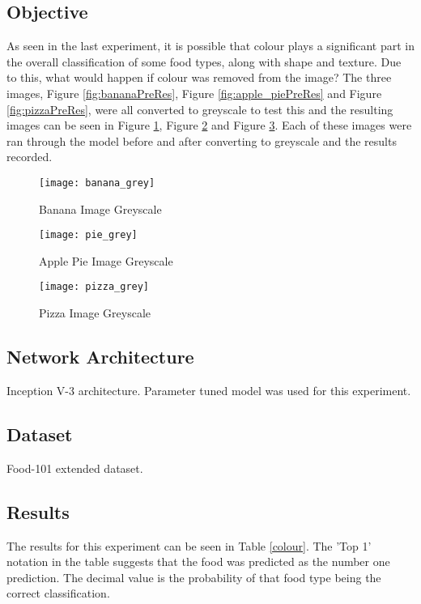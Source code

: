 \tocless\subsection{Objective}
As seen in the last experiment, it is possible that colour plays a significant part in the overall classification of some food types, along with shape and texture. Due to this, what would happen if colour was removed from the image? The three images, Figure \ref{fig:bananaPreRes}, Figure \ref{fig:apple_piePreRes} and Figure \ref{fig:pizzaPreRes}, were all converted to greyscale to test this and the resulting images can be seen in Figure \ref{fig:bananaGrey}, Figure \ref{fig:applePieGrey} and Figure \ref{fig:pizzaGrey}. Each of these images were ran through the model before and after converting to greyscale and the results recorded.

\begin{figure}[h]
	\centering
    \texttt{[image: banana\_grey]}
    \caption{Banana Image Greyscale}
    \label{fig:bananaGrey}
\end{figure}

\begin{figure}[h]
	\centering
    \texttt{[image: pie\_grey]}
    \caption{Apple Pie Image Greyscale}
    \label{fig:applePieGrey}
\end{figure}

\begin{figure}[h]
	\centering
    \texttt{[image: pizza\_grey]}
    \caption{Pizza Image Greyscale}
    \label{fig:pizzaGrey}
\end{figure}

\tocless\subsection{Network Architecture}
Inception V-3 architecture. Parameter tuned model was used for this experiment.

\tocless\subsection{Dataset}
Food-101 extended dataset.

\tocless\subsection{Results}
The results for this experiment can be seen in Table \ref{colour}.
The 'Top 1' notation in the table suggests that the food was predicted as the number one prediction. The decimal value is the probability of that food type being the correct classification.


